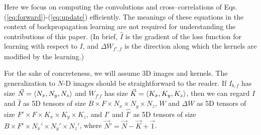   Here we focus on computing the convolutions and cross--correlations
  of Eqs. (\ref{eq:forward})-(\ref{eq:update}) efficiently.  The
  meanings of these equations in the context of backpropagation
  learning are not required for understanding the contributions of
  this paper.  (In brief, $\hat{I}$ is the gradient of the loss
  function for learning with respect to $I$, and $\Delta W_{f',f}$ is
  the direction along which the kernels are modified by the learning.)



  For the sake of concreteness, we will assume 3D images and
  kernels. The generalization to $N$-D images should be
  straightforward to the reader.
  If $I_{b,f}$ has size $\vec{N} = \langle N_x, N_y, N_z\rangle$ and
  $W_{f'f}$ has size $\vec{K} = \langle K_x,K_y,K_z\rangle$, then we can
  regard $I$ and $\hat{I}$ as 5D tensors of size $B \times F \times N_x
  \times N_y \times N_z$, $W$ and $\Delta W$ as 5D tensors of size $F'
  \times F \times K_x \times K_y \times K_z$, and $I'$ and $\hat{I'}$ as
  5D tensors of size $B \times F' \times N_x' \times N_y' \times N_z'$,
  where $\vec{N}' = \vec{N} - \vec{K} + \vec{1}$.
